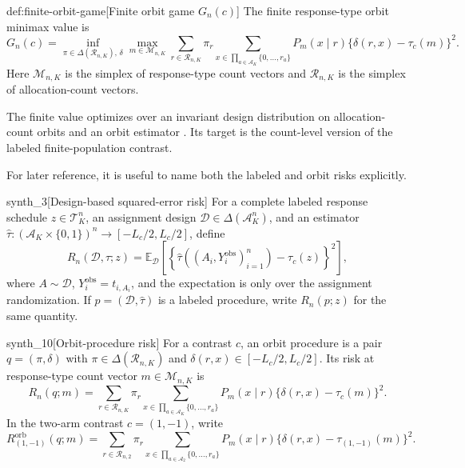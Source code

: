 \begin{definitionv}{def:finite-orbit-game}[Finite orbit game $G_n(c)$]
The finite response-type orbit minimax value is
\[
G_n(c)=\inf_{\pi\in\Delta(\mathcal R_{n,K}),\,\delta}\max_{m\in\mathcal M_{n,K}}\sum_{r\in\mathcal R_{n,K}}\pi_r\sum_{x\in\prod_{a\in\mathcal A_K}\{0,\ldots,r_a\}}P_m(x\mid r)\{\delta(r,x)-\tau_c(m)\}^2.
\]
Here \(\mathcal M_{n,K}\) is the simplex of response-type count vectors and \(\mathcal R_{n,K}\) is the simplex of allocation-count vectors.
\end{definitionv}

The finite value  optimizes over an invariant design distribution  on allocation-count orbits and an orbit estimator . Its target  is the count-level version of the labeled finite-population contrast.

For later reference, it is useful to name both the labeled and orbit risks explicitly.

\begin{definitionv}{synth_3}[Design-based squared-error risk]
For a complete labeled response schedule \(z\in\mathcal T_K^n\), an assignment design \(\mathcal D\in\Delta(\mathcal A_K^n)\), and an estimator \(\widehat\tau:(\mathcal A_K\times\{0,1\})^n\to[-L_c/2,L_c/2]\), define
\[
R_n(\mathcal D,\widehat\tau;z)
=\mathbb E_{\mathcal D}\left[\left\{\widehat\tau((A_i,Y_i^{\mathrm{obs}})_{i=1}^n)-\tau_c(z)\right\}^2\right],
\]
where \(A\sim\mathcal D\), \(Y_i^{\mathrm{obs}}=t_{i,A_i}\), and the expectation is only over the assignment randomization. If \(p=(\mathcal D,\widehat\tau)\) is a labeled procedure, write \(R_n(p;z)\) for the same quantity.
\end{definitionv}

\begin{definitionv}{synth_10}[Orbit-procedure risk]
For a contrast $c$, an orbit procedure is a pair $q=(\pi,\delta)$ with $\pi\in\Delta(\mathcal R_{n,K})$ and $\delta(r,x)\in[-L_c/2,L_c/2]$. Its risk at response-type count vector $m\in\mathcal M_{n,K}$ is
\[
R_n(q;m)=\sum_{r\in\mathcal R_{n,K}}\pi_r\sum_{x\in\prod_{a\in\mathcal A_K}\{0,\ldots,r_a\}}P_m(x\mid r)\{\delta(r,x)-\tau_c(m)\}^2.
\]
In the two-arm contrast $c=(1,-1)$, write
\[
R^{\mathrm{orb}}_{(1,-1)}(q;m)=\sum_{r\in\mathcal R_{n,2}}\pi_r\sum_{x\in\prod_{a\in\mathcal A_2}\{0,\ldots,r_a\}}P_m(x\mid r)\{\delta(r,x)-\tau_{(1,-1)}(m)\}^2.
\]
\end{definitionv}

